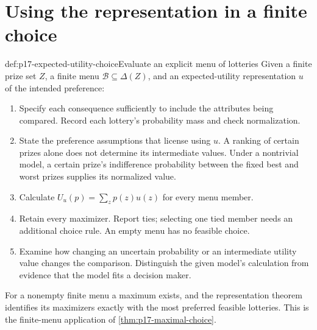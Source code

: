 \section{Using the representation in a finite choice}
\label{sec:p17-expected-utility-use}

\begin{hbmethod}{def:p17-expected-utility-choice}{Evaluate an explicit menu of lotteries}
Given a finite prize set \(Z\), a finite menu \(\mathcal B\subseteq\Delta(Z)\),
and an expected-utility representation \(u\) of the intended preference:
\begin{enumerate}
\item Specify each consequence sufficiently to include the attributes being
compared. Record each lottery's probability mass and check normalization.
\item State the preference assumptions that license using \(u\). A ranking
of certain prizes alone does not determine its intermediate values.
Under a nontrivial model, a certain prize's indifference probability between
the fixed best and worst prizes supplies its normalized value.
\item Calculate \(U_u(p)=\sum_zp(z)u(z)\) for every menu member.
\item Retain every maximizer. Report ties; selecting one tied member needs
an additional choice rule. An empty menu has no feasible choice.
\item Examine how changing an uncertain probability or an intermediate
utility value changes the comparison. Distinguish the given model's
calculation from evidence that the model fits a decision maker.
\end{enumerate}
For a nonempty finite menu a maximum exists, and the representation theorem
identifies its maximizers exactly with the most preferred feasible lotteries.
This is the finite-menu application of \cref{thm:p17-maximal-choice}.
\end{hbmethod}

